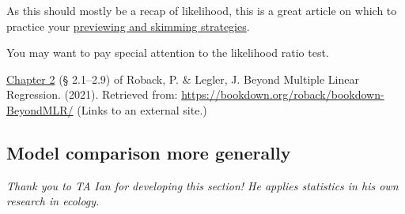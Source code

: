 \documentclass[
  openany]{book}
\begin{document}
As this should mostly be a recap of likelihood, this is a great article on which to practice your \protect\hyperlink{previewskim}{previewing and skimming strategies}.

You may want to pay special attention to the likelihood ratio test.

\href{https://bookdown.org/roback/bookdown-BeyondMLR/ch-beyondmost.html}{Chapter 2} (§ 2.1--2.9) of Roback, P. \& Legler, J. Beyond Multiple Linear Regression. (2021). Retrieved from: \url{https://bookdown.org/roback/bookdown-BeyondMLR/} (Links to an external site.)

\hypertarget{model-comparison-more-generally}{%
\subsection{Model comparison more generally}\label{model-comparison-more-generally}}

\emph{Thank you to TA Ian for developing this section! He applies statistics in his own research in ecology.}
\end{document}
